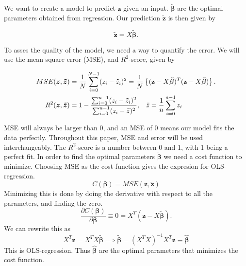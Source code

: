 \documentclass[reprint,english,notitlepage,aps,nobalancelastpage,nofootinbib]{revtex4-1}  %
\newcommand{\vc}[1]{\mathbf{#1}}
\begin{document}
We want to create a model to predict $\vc{z}$ given an input. $\boldsymbol{\tilde\beta}$ are the optimal parameters obtained from regression. Our prediction \(\boldsymbol{\tilde{\vc{z}}}\) is then given by

\begin{equation*}
	\boldsymbol{\tilde{z}} = X\boldsymbol{\tilde{\beta}}.
\end{equation*}

To asses the quality of the model, we need a way to quantify the error. We will use the mean square error (MSE), and $R^2$-score, given by

{\large
\begin{align*}
	MSE(\boldsymbol{z}, \boldsymbol{\tilde{z}}) &= \frac{1}{N}\sum_{i=0}^{N-1} (z_i - \tilde{z}_i)^2 = \frac{1}{N}\left\{(\vc{z} - X\boldsymbol{\tilde{\beta}})^T(\vc{z} - X\boldsymbol{\tilde{\beta}})\right\}.
	\\
	R^2(\boldsymbol{z}, \boldsymbol{\tilde{z}}) &= 1 - \frac{\sum_{i=0}^{n-1}(z_i - \tilde{z}_i)^2}{\sum_{i=0}^{n-1}(z_i - \bar{z})^2}, \hspace{3mm} \bar{z} = \frac{1}{n}\sum_{i=0}^{n-1}z_i
\end{align*}
}%

MSE will always be larger than 0, and an MSE of 0 means our model fits the data perfectly. Throughout this paper, MSE and error will be used interchangeably. The $R^2$-score is a number between 0 and 1, with 1 being a perfect fit. In order to find the optimal parameters $\boldsymbol{\tilde{\beta}}$ we need a cost function to minimize. Choosing MSE as the cost-function gives the expresion for OLS-regression.
\begin{equation*}
	C(\boldsymbol{\beta}) = MSE(\boldsymbol{z}, \boldsymbol{\tilde{z}})
\end{equation*}
Minimizing this is done by doing the derivative with respect to all the parameters, and finding the zero.
\begin{equation}\label{eq:Const_OLS}
	\frac{\partial C(\boldsymbol{\beta})}{\partial \boldsymbol{\beta}} \equiv 0 = X^T(\boldsymbol{z} - X\boldsymbol{\tilde{\beta}}).
\end{equation}
We can rewrite this as
\begin{equation}\label{eq:OLS_beta}
	X^T\vc{z} = X^TX\boldsymbol{\tilde{\beta}} \implies \boldsymbol{\tilde{\beta}} = (X^TX)^{-1} X^T \vc{z} \equiv \boldsymbol{\hat{\beta}}
\end{equation}
This is OLS-regression. Thus $\boldsymbol{\hat{\beta}}$ are the optimal parameters that minimizes the cost function.
\end{document}

